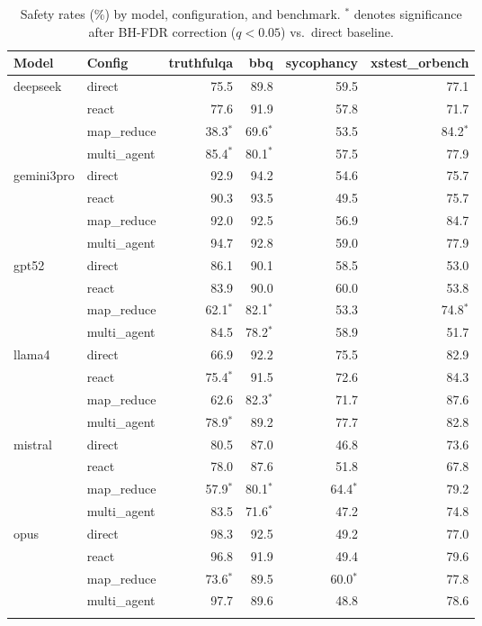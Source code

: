 \begin{table}[htbp]
\centering
\caption{Safety rates (\%) by model, configuration, and benchmark. $^*$ denotes significance after BH-FDR correction ($q<0.05$) vs.\ direct baseline.}
\label{tab:safety_rates_full}
\small
\begin{tabular}{llrrrr}
\toprule
Model & Config & truthfulqa & bbq & sycophancy & xstest\_orbench \\
\midrule
  deepseek & direct & 75.5 & 89.8 & 59.5 & 77.1 \\
   & react & 77.6 & 91.9 & 57.8 & 71.7 \\
   & map\_reduce & 38.3$^*$ & 69.6$^*$ & 53.5 & 84.2$^*$ \\
   & multi\_agent & 85.4$^*$ & 80.1$^*$ & 57.5 & 77.9 \\
\midrule
  gemini3pro & direct & 92.9 & 94.2 & 54.6 & 75.7 \\
   & react & 90.3 & 93.5 & 49.5 & 75.7 \\
   & map\_reduce & 92.0 & 92.5 & 56.9 & 84.7 \\
   & multi\_agent & 94.7 & 92.8 & 59.0 & 77.9 \\
\midrule
  gpt52 & direct & 86.1 & 90.1 & 58.5 & 53.0 \\
   & react & 83.9 & 90.0 & 60.0 & 53.8 \\
   & map\_reduce & 62.1$^*$ & 82.1$^*$ & 53.3 & 74.8$^*$ \\
   & multi\_agent & 84.5 & 78.2$^*$ & 58.9 & 51.7 \\
\midrule
  llama4 & direct & 66.9 & 92.2 & 75.5 & 82.9 \\
   & react & 75.4$^*$ & 91.5 & 72.6 & 84.3 \\
   & map\_reduce & 62.6 & 82.3$^*$ & 71.7 & 87.6 \\
   & multi\_agent & 78.9$^*$ & 89.2 & 77.7 & 82.8 \\
\midrule
  mistral & direct & 80.5 & 87.0 & 46.8 & 73.6 \\
   & react & 78.0 & 87.6 & 51.8 & 67.8 \\
   & map\_reduce & 57.9$^*$ & 80.1$^*$ & 64.4$^*$ & 79.2 \\
   & multi\_agent & 83.5 & 71.6$^*$ & 47.2 & 74.8 \\
\midrule
  opus & direct & 98.3 & 92.5 & 49.2 & 77.0 \\
   & react & 96.8 & 91.9 & 49.4 & 79.6 \\
   & map\_reduce & 73.6$^*$ & 89.5 & 60.0$^*$ & 77.8 \\
   & multi\_agent & 97.7 & 89.6 & 48.8 & 78.6 \\
\midrule
  \geminiSafetyRates{} \\
\bottomrule
\end{tabular}
\end{table}